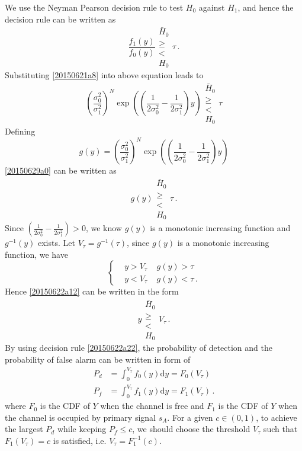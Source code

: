 We use the Neyman Pearson decision rule to test $H_0$ against $H_1$, and hence the decision rule can be written as
\begin{equation}
  \frac{f_1(y)}{f_0(y)} \substack{\bar{H}_0 \\ \geq \\ < \\ H_0} \tau\,.
\end{equation}
Substituting \eqref{20150621a8} into above equation leads to 
\begin{equation}
  \left(\frac{\sigma_0^2}{\sigma_1^2}\right)^N\exp\left( (\frac{1}{2\sigma_0^2} -  \frac{1}{2\sigma_1^2}  )y \right)\substack{\bar{H}_0 \\ \geq \\ < \\ H_0} \tau
\end{equation}
Defining 
\begin{equation}
  g(y) = \left(\frac{\sigma_0^2}{\sigma_1^2}\right)^N\exp\left( (\frac{1}{2\sigma_0^2} -  \frac{1}{2\sigma_1^2}  )y \right)
  \label{20150629a0}
\end{equation}
\eqref{20150629a0} can be written as
\begin{equation}
  g(y) \substack{\bar{H}_0 \\ \geq \\ < \\ H_0} \tau\,.
  \label{20150622a12}
\end{equation}
Since $(\frac{1}{2\sigma_0^2} -  \frac{1}{2\sigma_1^2}  ) >  0$, we know $g(y)$ is a monotonic increasing function and $g^{-1}(y) $ exists.  
Let $V_\tau = g^{-1}(\tau)$, since $g(y)$ is a monotonic increasing function, we have 
\begin{equation}
  \begin{cases}
    &y > V_\tau\;\;\;\;g(y) > \tau\\
    &y < V_\tau\;\;\;\;g(y) < \tau\,.
  \end{cases}
\end{equation}
Hence \eqref{20150622a12} can be written in the form 
\begin{equation}
  y  \substack{\bar{H}_0 \\ \geq \\ < \\ H_0} V_\tau\,.
  \label{20150622a22}
\end{equation}
By using decision rule \eqref{20150622a22}, the probability of detection and the probability of false alarm can be written in form of 
\begin{equation}
  \begin{split}
  P_d &= \int_{0}^{V_\tau} f_0(y) \mathrm{d}y = F_0(V_\tau)\\
  P_f &= \int_{0}^{V_\tau} f_1(y) \mathrm{d}y= F_1(V_\tau)\,.
    \end{split}
    \label{20150622a32}
  \end{equation}
  where $F_0$ is the CDF of $Y$ when the channel is free and $F_1$ is the CDF of $Y$ when the channel is occupied by primary signal $s_A$. For a given $c \in (0, 1)$, to achieve the largest  $P_d$ while keeping $P_f \leq c$, we should choose the threshold $V_\tau$ such that $F_1(V_\tau) = c$ is satisfied, i.e. $V_\tau = F^{-1}_1(c)$. 

